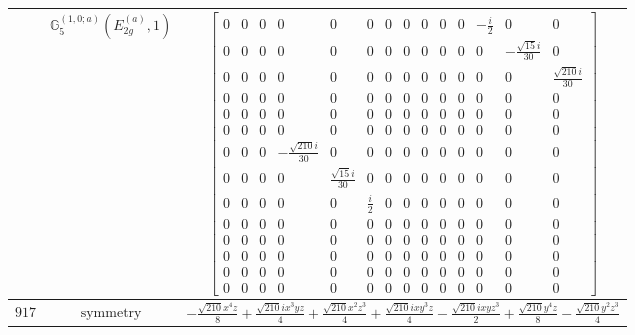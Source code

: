 \documentclass[fleqn,8pt,landscape]{jsarticle}
\begin{document}
\begin{longtable}{ccc}
$  $ & $ \mathbb{G}_{5}^{(1,0;a)}(E_{2g}^{(a)},1) $ & $ \begin{bmatrix} 0 & 0 & 0 & 0 & 0 & 0 & 0 & 0 & 0 & 0 & 0 & - \frac{i}{2} & 0 & 0 \\ 0 & 0 & 0 & 0 & 0 & 0 & 0 & 0 & 0 & 0 & 0 & 0 & - \frac{\sqrt{15} i}{30} & 0 \\ 0 & 0 & 0 & 0 & 0 & 0 & 0 & 0 & 0 & 0 & 0 & 0 & 0 & \frac{\sqrt{210} i}{30} \\ 0 & 0 & 0 & 0 & 0 & 0 & 0 & 0 & 0 & 0 & 0 & 0 & 0 & 0 \\ 0 & 0 & 0 & 0 & 0 & 0 & 0 & 0 & 0 & 0 & 0 & 0 & 0 & 0 \\ 0 & 0 & 0 & 0 & 0 & 0 & 0 & 0 & 0 & 0 & 0 & 0 & 0 & 0 \\ 0 & 0 & 0 & - \frac{\sqrt{210} i}{30} & 0 & 0 & 0 & 0 & 0 & 0 & 0 & 0 & 0 & 0 \\ 0 & 0 & 0 & 0 & \frac{\sqrt{15} i}{30} & 0 & 0 & 0 & 0 & 0 & 0 & 0 & 0 & 0 \\ 0 & 0 & 0 & 0 & 0 & \frac{i}{2} & 0 & 0 & 0 & 0 & 0 & 0 & 0 & 0 \\ 0 & 0 & 0 & 0 & 0 & 0 & 0 & 0 & 0 & 0 & 0 & 0 & 0 & 0 \\ 0 & 0 & 0 & 0 & 0 & 0 & 0 & 0 & 0 & 0 & 0 & 0 & 0 & 0 \\ 0 & 0 & 0 & 0 & 0 & 0 & 0 & 0 & 0 & 0 & 0 & 0 & 0 & 0 \\ 0 & 0 & 0 & 0 & 0 & 0 & 0 & 0 & 0 & 0 & 0 & 0 & 0 & 0 \\ 0 & 0 & 0 & 0 & 0 & 0 & 0 & 0 & 0 & 0 & 0 & 0 & 0 & 0 \end{bmatrix} $ \\ \hline
$ 917 $ & $ \text{symmetry} $ & $ - \frac{\sqrt{210} x^{4} z}{8} + \frac{\sqrt{210} i x^{3} y z}{4} + \frac{\sqrt{210} x^{2} z^{3}}{4} + \frac{\sqrt{210} i x y^{3} z}{4} - \frac{\sqrt{210} i x y z^{3}}{2} + \frac{\sqrt{210} y^{4} z}{8} - \frac{\sqrt{210} y^{2} z^{3}}{4} $ \\

\end{longtable}
\end{document}
